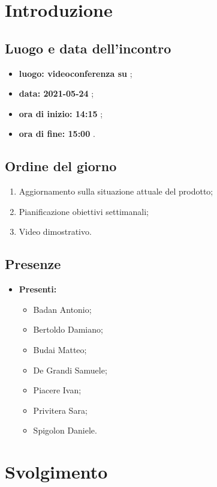 \section*{Introduzione}
\subsection*{Luogo e data dell'incontro}
\begin{itemize}
	\item \textbf{luogo: videoconferenza su } ;
	\item \textbf{data: 2021-05-24} ;
	\item \textbf{ora di inizio: 14:15} ;
	\item \textbf{ora di fine: 15:00} .
\end{itemize}

\subsection*{Ordine del giorno}
\begin{enumerate}
	\item Aggiornamento sulla situazione attuale del prodotto;
	\item Pianificazione obiettivi settimanali;
	\item Video dimostrativo.
\end{enumerate}

\subsection*{Presenze}
\begin{itemize}
	\item \textbf{Presenti:}
	\begin{itemize}
		\item Badan Antonio;
		\item Bertoldo Damiano;
		\item Budai Matteo;
		\item De Grandi Samuele;
		\item Piacere Ivan;
		\item Privitera Sara;
		\item Spigolon Daniele.
	\end{itemize}
\end{itemize}

\section*{Svolgimento}
